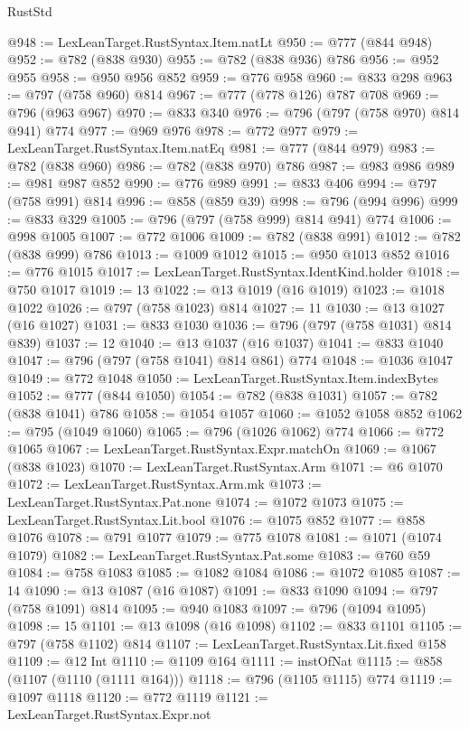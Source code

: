 \begin{lexlean}{RustStd}
\begin{coremodule}
@948 := LexLeanTarget.RustSyntax.Item.natLt
@950 := @777 (@844 @948)
@952 := @782 (@838 @930)
@955 := @782 (@838 @936) @786
@956 := @952 @955
@958 := @950 @956 @852
@959 := @776 @958
@960 := @833 @298
@963 := @797 (@758 @960) @814
@967 := @777 (@778 @126) @787 @708
@969 := @796 (@963 @967)
@970 := @833 @340
@976 := @796 (@797 (@758 @970) @814 @941) @774
@977 := @969 @976
@978 := @772 @977
@979 := LexLeanTarget.RustSyntax.Item.natEq
@981 := @777 (@844 @979)
@983 := @782 (@838 @960)
@986 := @782 (@838 @970) @786
@987 := @983 @986
@989 := @981 @987 @852
@990 := @776 @989
@991 := @833 @406
@994 := @797 (@758 @991) @814
@996 := @858 (@859 @39)
@998 := @796 (@994 @996)
@999 := @833 @329
@1005 := @796 (@797 (@758 @999) @814 @941) @774
@1006 := @998 @1005
@1007 := @772 @1006
@1009 := @782 (@838 @991)
@1012 := @782 (@838 @999) @786
@1013 := @1009 @1012
@1015 := @950 @1013 @852
@1016 := @776 @1015
@1017 := LexLeanTarget.RustSyntax.IdentKind.holder
@1018 := @750 @1017
@1019 := 13
@1022 := @13 @1019 (@16 @1019)
@1023 := @1018 @1022
@1026 := @797 (@758 @1023) @814
@1027 := 11
@1030 := @13 @1027 (@16 @1027)
@1031 := @833 @1030
@1036 := @796 (@797 (@758 @1031) @814 @839)
@1037 := 12
@1040 := @13 @1037 (@16 @1037)
@1041 := @833 @1040
@1047 := @796 (@797 (@758 @1041) @814 @861) @774
@1048 := @1036 @1047
@1049 := @772 @1048
@1050 := LexLeanTarget.RustSyntax.Item.indexBytes
@1052 := @777 (@844 @1050)
@1054 := @782 (@838 @1031)
@1057 := @782 (@838 @1041) @786
@1058 := @1054 @1057
@1060 := @1052 @1058 @852
@1062 := @795 (@1049 @1060)
@1065 := @796 (@1026 @1062) @774
@1066 := @772 @1065
@1067 := LexLeanTarget.RustSyntax.Expr.matchOn
@1069 := @1067 (@838 @1023)
@1070 := LexLeanTarget.RustSyntax.Arm
@1071 := @6 @1070
@1072 := LexLeanTarget.RustSyntax.Arm.mk
@1073 := LexLeanTarget.RustSyntax.Pat.none
@1074 := @1072 @1073
@1075 := LexLeanTarget.RustSyntax.Lit.bool
@1076 := @1075 @852
@1077 := @858 @1076
@1078 := @791 @1077
@1079 := @775 @1078
@1081 := @1071 (@1074 @1079)
@1082 := LexLeanTarget.RustSyntax.Pat.some
@1083 := @760 @59
@1084 := @758 @1083
@1085 := @1082 @1084
@1086 := @1072 @1085
@1087 := 14
@1090 := @13 @1087 (@16 @1087)
@1091 := @833 @1090
@1094 := @797 (@758 @1091) @814
@1095 := @940 @1083
@1097 := @796 (@1094 @1095)
@1098 := 15
@1101 := @13 @1098 (@16 @1098)
@1102 := @833 @1101
@1105 := @797 (@758 @1102) @814
@1107 := LexLeanTarget.RustSyntax.Lit.fixed @158
@1109 := @12 Int
@1110 := @1109 @164
@1111 := instOfNat
@1115 := @858 (@1107 (@1110 (@1111 @164)))
@1118 := @796 (@1105 @1115) @774
@1119 := @1097 @1118
@1120 := @772 @1119
@1121 := LexLeanTarget.RustSyntax.Expr.not

\end{coremodule}
\end{lexlean}
